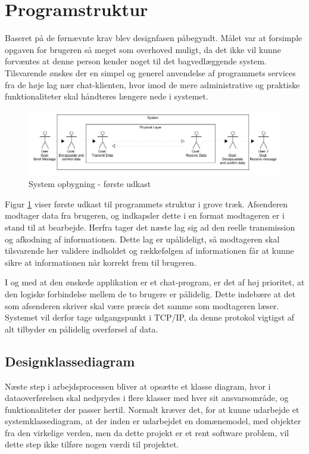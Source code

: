 \section{Programstruktur}
Baseret på de førnævnte krav blev designfasen påbegyndt. Målet var at forsimple opgaven for brugeren så meget som overhoved muligt, da det ikke vil kunne forvæntes at denne person kender noget til det bagvedlæggende system. 
Tilsvarende ønskes der en simpel og generel anvendelse af programmets services fra de høje lag nær chat-klienten, hvor imod de mere administrative og praktiske funktionaliteter skal håndteres længere nede i systemet.

\begin{figure}[h!]
\centering
\includegraphics[scale=0.5]{Billeder/ProgramOpbygning1.JPG}
\caption{System opbygning - første udkast}
\label{fig:Blokdiagram}
\end{figure}

Figur \ref{fig:Blokdiagram} viser første udkast til programmets struktur i grove træk. Afsenderen modtager data fra brugeren, og indkapsler dette i en format modtageren er i stand til at bearbejde. Herfra tager det næste lag sig ad den reelle transmission og afkodning af informationen. Dette lag er upålideligt, så modtageren skal tilsvarende her validere indholdet og rækkefølgen af informationen får at kunne sikre at informationen når korrekt frem til brugeren. 

I og med at den ønskede applikation er et chat-program, er det af høj prioritet, at den logiske forbindelse mellem de to brugere er pålidelig. Dette indebære at det som afsenderen skriver skal være præcis det samme som modtageren læser. Systemet vil derfor tage udgangspunkt i TCP/IP, da denne protokol vigtigst af alt tilbyder en pålidelig overførsel af data. 


\subsection{Designklassediagram}
Næste step i arbejdsprocessen bliver at opsætte et klasse diagram, hvor i dataoverførelsen skal nedprydes i flere klasser med hver sit ansvarsområde, og funktionaliteter der passer hertil. Normalt kræver det, for at kunne udarbejde et systemklassediagram, at der inden er udarbejdet en domænemodel, med objekter fra den virkelige verden, men da dette projekt er et rent software problem, vil dette step ikke tilføre nogen værdi til projektet. 

